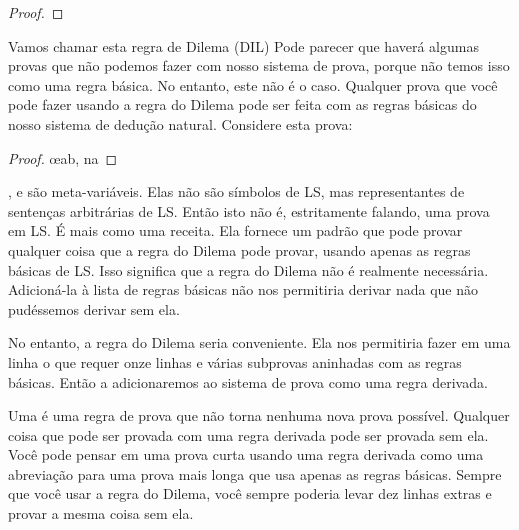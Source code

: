 \begin{proof}
	 
\end{proof}

Vamos chamar esta regra de Dilema (DIL) Pode parecer que haverá algumas provas que não podemos fazer com nosso sistema de prova, porque não temos isso como uma regra básica. No entanto, este não é o caso. Qualquer prova que você pode fazer usando a regra do Dilema pode ser feita com as regras básicas do nosso sistema de dedução natural. Considere esta prova:

\begin{proof}
	\open
		\open
		\close
		\open
		\close
		\oe{ab, na}
	\close
	 
\end{proof}

,  e  são meta-variáveis. Elas não são símbolos de LS, mas representantes de sentenças arbitrárias de LS. Então isto não é, estritamente falando, uma prova em LS. É mais como uma receita. Ela fornece um padrão que pode provar qualquer coisa que a regra do Dilema pode provar, usando apenas as regras básicas de LS. Isso significa que a regra do Dilema não é realmente necessária. Adicioná-la à lista de regras básicas não nos permitiria derivar nada que não pudéssemos derivar sem ela.

No entanto, a regra do Dilema seria conveniente. Ela nos permitiria fazer em uma linha o que requer onze linhas e várias subprovas aninhadas com as regras básicas. Então a adicionaremos ao sistema de prova como uma regra derivada.

Uma  é uma regra de prova que não torna nenhuma nova prova possível. Qualquer coisa que pode ser provada com uma regra derivada pode ser provada sem ela. Você pode pensar em uma prova curta usando uma regra derivada como uma abreviação para uma prova mais longa que usa apenas as regras básicas. Sempre que você usar a regra do Dilema, você sempre poderia levar dez linhas extras e provar a mesma coisa sem ela.

